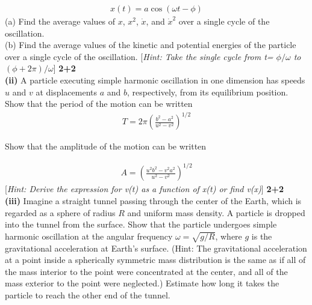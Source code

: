 \documentclass[12pt, a4paper]{article}
\begin{document}
{\begin{align*}
    x(t) = a \cos(\omega t-\phi)
\end{align*}
(a) Find the average values of $x$, $x^2$, $\dot{x}$, and $\dot{x}^2$ over a single cycle of the oscillation.\\
(b) Find the average values of the kinetic and potential energies of the particle over a single cycle of 
the oscillation. [\textit{Hint: Take the single cycle from t= $\phi/\omega$  to $(\phi  + 2\pi)/\omega$}] 
\hfill \textbf{2+2}\\

\noindent
\textbf{(ii)} A particle executing simple harmonic oscillation in one dimension has speeds $u$ and $v$
at displacements $a$ and $b$, respectively, from its equilibrium position.
Show that the period of the motion can be written
\begin{align*}
    T = 2\pi\left(\frac{b^2-a^2}{u^2-v^2}\right)^{1/2}
\end{align*}

Show that the amplitude of the motion can be written

\begin{align*}
    A= \left(\frac{u^2 b^2-v^2 a^2}{u^2-v^2}\right)^{1/2}
\end{align*}[\textit{Hint: Derive the expression for v(t) as a function of x(t) or find v(x)}]  \hfill \textbf{2+2}\\

\noindent
\textbf{(iii)} Imagine a straight tunnel passing through the center of the Earth, which is regarded 
as a sphere of radius $R$ and uniform mass density. A particle is dropped into the tunnel from the 
surface. Show that the particle undergoes simple harmonic oscillation at the angular frequency 
$\omega=\sqrt{g/R}$, where $g$ is the gravitational acceleration at Earth's surface. (Hint: The 
gravitational acceleration at a point inside a spherically symmetric mass distribution is the same 
as if all of the mass interior to the point were concentrated at the center, and all of the mass 
exterior to the point were neglected.) Estimate how long it takes the particle to reach the other 
end of the tunnel.

}
\end{document}
